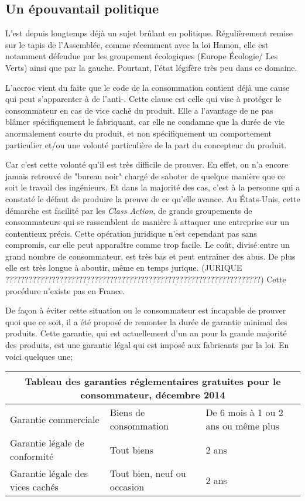 \subsection{Un épouvantail politique}
L'\op est depuis longtemps déjà un sujet brûlant en politique. Régulièrement remise sur le tapis de l'Assemblée, comme récemment avec la loi Hamon, elle est notamment défendue par les groupement écologiques (Europe Écologie/ Les Verts) ainsi que par la gauche.
Pourtant, l'état légifère très peu dans ce domaine.

\smallbreak L'accroc vient du faite que le code de la consommation contient déjà une cause qui peut s'apparenter à de l'anti-\op.
Cette clause est celle qui vise à protéger le consommateur en cas de vice caché du produit. 
Elle a l'avantage de ne pas blâmer spécifiquement le fabriquant, car elle ne condamne que la durée de vie anormalement courte du produit, et non spécifiquement un comportement particulier et/ou une volonté particulière de la part du concepteur du produit.

\smallbreak Car c'est cette volonté qu'il est très difficile de prouver. En effet, on n'a encore jamais retrouvé de "bureau noir" chargé de saboter de quelque manière que ce soit le travail des ingénieurs. Et dans la majorité des cas, c'est à la personne qui a constaté le défaut de produire la preuve de ce qu'elle avance.
Au États-Unis, cette démarche est facilité par les \textit{Class Action}, de grands groupements de consommateurs qui se rassemblent de manière à attaquer une entreprise sur un contentieux précis. Cette opération juridique n'est cependant pas sans compromis, car elle peut apparaître comme trop facile.
Le coût, divisé entre un grand nombre de consommateur, est très bas et peut entraîner des abus.
De plus elle est très longue à aboutir, même en temps jurique. (JURIQUE ??????????????????????????????????????????????????????????????????)
Cette procédure n'existe pas en France.

\smallbreak De façon à éviter cette situation ou le consommateur est incapable de prouver quoi que ce soit, il a été proposé de remonter la durée de garantie minimal des produits. Cette garantie, qui est actuellement d'un an pour la grande majorité des produits, est une garantie légal qui est imposé aux fabricants par la loi. 
En voici quelques une;

\begin{center}
\begin{tabular}{|l|l|p{5cm}|}
  \hline
  \multicolumn{3}{|c|}{Tableau des garanties réglementaires gratuites pour le consommateur, décembre 2014} \\
	\hline Garantie commerciale & Biens de consommation & De 6 mois à 1 ou 2 ans ou même plus\\
	       Garantie légale de conformité & Tout biens & 2 ans \\
	       Garantie légale des vices cachés & Tout bien, neuf ou occasion & 2 ans \\
	\hline
\end{tabular}
\end{center}

